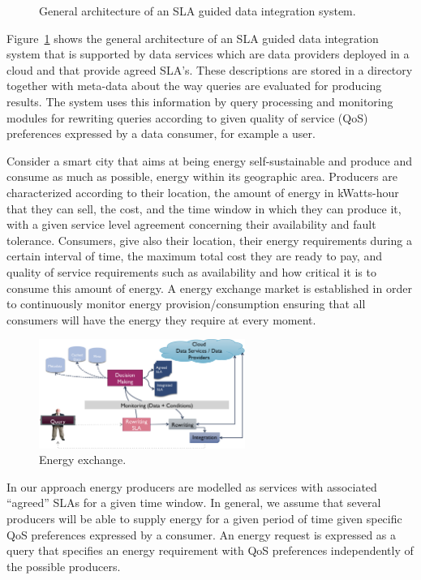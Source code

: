\begin{figure}
\caption{General architecture of an SLA guided  data integration system.\label{fig:arch}}
\end{figure}

Figure~\ref{fig:arch} shows the general architecture of an SLA guided data integration system that is supported by data services which are data providers deployed in a cloud and that provide agreed SLA’s. 
These descriptions are stored in a directory together with meta-data about the way queries are evaluated for producing results. 
The system uses this information  by query processing and monitoring modules for rewriting queries according to given quality of service (QoS) preferences expressed by a data consumer, for example a user.


Consider a smart city that aims at being energy self-sustainable and produce and consume as much as possible, energy within its geographic area. 
Producers are characterized according to their location, the amount of energy in kWatts-hour that they can sell, the cost, and the time window in which they can produce it, with a given service level agreement concerning their availability and fault tolerance. 
Consumers, give also their location, their energy requirements during a certain interval of time, the maximum total cost they are ready to pay, and quality of service requirements such as availability and how critical it is to consume this amount of energy. 
A energy exchange market is established in order to continuously monitor energy provision/consumption ensuring that all consumers will have the energy they require at every moment.

\begin{figure}
\includegraphics[width=0.6\textwidth]{figs/arch.png}
\caption{\label{fig:energyXChange} Energy exchange.}
\end{figure}

In our approach energy producers are modelled as services with associated ``agreed'' SLAs for a given time window. 
In general, we assume that several producers will be able to supply energy for a given period of time given specific QoS preferences expressed by a consumer. 
An energy request is expressed as a query that specifies an energy requirement with QoS preferences independently of the possible producers. 


